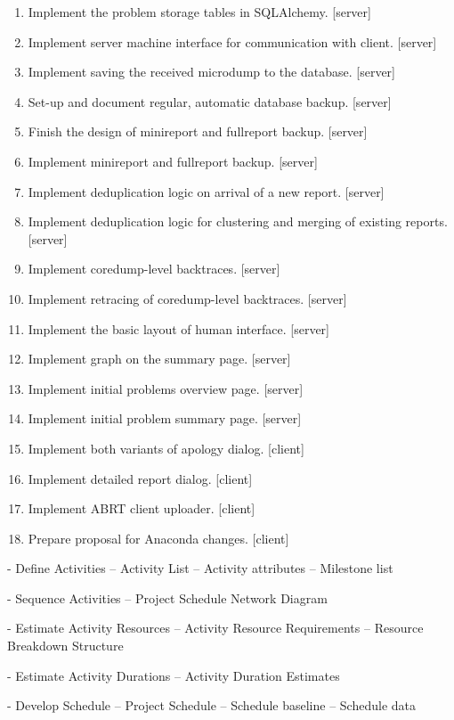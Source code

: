 \documentclass{article}
\begin{document}
\begin{enumerate}
\item Implement the problem storage tables in SQLAlchemy. [server]
\item Implement server machine interface for communication with client. [server]
\item Implement saving the received microdump to the database. [server]
\item Set-up and document regular, automatic database backup. [server]
\item Finish the design of minireport and fullreport backup. [server]
\item Implement minireport and fullreport backup. [server]
\item Implement deduplication logic on arrival of a new report. [server]
\item Implement deduplication logic for clustering and merging of
  existing reports. [server]
\item Implement coredump-level backtraces. [server]
\item Implement retracing of coredump-level backtraces. [server]
\item Implement the basic layout of human interface. [server]
\item Implement graph on the summary page. [server]
\item Implement initial problems overview page. [server]
\item Implement initial problem summary page. [server]
\item Implement both variants of apology dialog. [client]
\item Implement detailed report dialog. [client]
\item Implement ABRT client uploader. [client]
\item Prepare proposal for Anaconda changes. [client]
\end{enumerate}

- Define Activities
-- Activity List
-- Activity attributes
-- Milestone list

- Sequence Activities
-- Project Schedule Network Diagram

- Estimate Activity Resources
-- Activity Resource Requirements
-- Resource Breakdown Structure

- Estimate Activity Durations
-- Activity Duration Estimates

- Develop Schedule
-- Project Schedule
-- Schedule baseline
-- Schedule data

\end{document}
